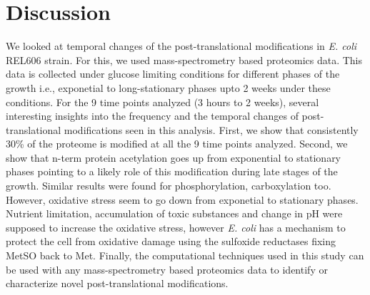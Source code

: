 \documentclass[12pt]{article}
\begin{document}


\section{Discussion}



We looked at temporal changes of the post-translational modifications in \emph{E. coli} REL606 strain. For this, we used mass-spectrometry based proteomics data. This data is collected under glucose limiting conditions for different phases of the growth i.e., exponetial to long-stationary phases upto 2 weeks under these conditions. For the 9 time points analyzed (3 hours to 2 weeks), several interesting insights into the frequency and the temporal changes of post-translational modifications seen in this analysis. First, we show that consistently 30\% of the proteome is modified at all the 9 time points analyzed. Second, we show that n-term protein acetylation goes up from exponential to stationary phases pointing to a likely role of this modification during late stages of the growth. Similar results were found for phosphorylation, carboxylation too. However, oxidative stress seem to go down from exponetial to stationary phases. Nutrient limitation, accumulation of toxic substances and change in pH were supposed to increase the oxidative stress, however \emph{E. coli} has a mechanism to protect the cell from oxidative damage using the sulfoxide reductases fixing MetSO back to Met. Finally, the computational techniques used in this study can be used with any mass-spectrometry based proteomics data to identify or characterize novel post-translational modifications.
\end{document}
